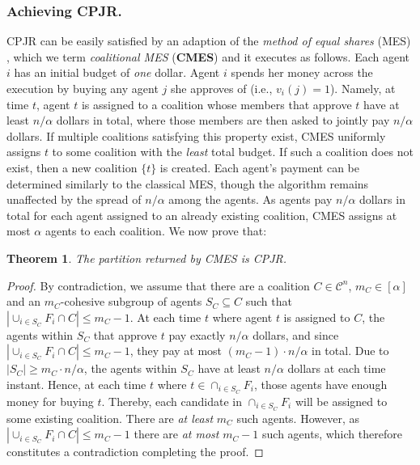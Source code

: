 \documentclass[letterpaper]{article} %
\newtheorem{theorem}{Theorem}
\begin{document}
\subsubsection{Achieving CPJR.}
\label{sec:Proportional Justified Representation (PJR)}
CPJR can be easily satisfied by an adaption of the \textit{method of equal shares} (MES) \cite{peters2021proportional,peters2020proportionality}, which we term \textit{coalitional MES} (\textbf{CMES}) and it executes as follows. Each agent $i$ has an initial budget of \textit{one} dollar. Agent $i$ spends her money across the execution by buying any agent $j$ she approves of (i.e., $v_i(j) = 1$). Namely, at time $t$, agent $t$ is assigned to a coalition whose members that approve $t$ have at least $n/\alpha$ dollars in total, where those members are then asked to jointly pay $n/\alpha$ dollars. If multiple coalitions satisfying this property exist, CMES uniformly assigns $t$ to some coalition with the \textit{least} total budget. If such a coalition does not exist, then a new coalition $\{t\}$ is created. Each agent's payment can be determined similarly to the classical MES, though the algorithm remains unaffected by the spread of $n/\alpha$ among the agents. As agents pay $n/\alpha$ dollars in total for each agent assigned to an already existing coalition, CMES assigns at most $\alpha$ agents to each coalition. We now prove that:
\begin{theorem}
    \label{thm:cmes}
    The partition returned by CMES is CPJR.
\end{theorem}
\begin{proof}
    By contradiction, we assume that there are a coalition $C \in \mathcal{C}^n$, $m_C \in [\alpha]$ and an $m_C$-cohesive subgroup of agents $S_C \subseteq C$ such that $|\cup_{i \in S_C} F_i \cap C| \leq m_C-1$. At each time $t$ where agent $t$ is assigned to $C$, the agents within $S_C$ that approve $t$ pay exactly $n/\alpha$ dollars, and since $|\cup_{i \in S_C} F_i \cap C| \leq m_C-1$, they pay at most $(m_C-1) \cdot n/\alpha$ in total. Due to $|S_C| \geq m_C \cdot n/\alpha$, the agents within $S_C$ have at least $n/\alpha$ dollars at each time instant. Hence, at each time $t$ where $t \in \cap_{i \in S_C} F_i$, those agents have enough money for buying $t$. Thereby, each candidate in $\cap_{i \in S_C} F_i$ will be assigned to some existing coalition. There are \textit{at least} $m_C$ such agents. However, as $|\cup_{i \in S_C} F_i \cap C| \leq m_C-1$ there are \textit{at most} $m_C - 1$ such agents, which therefore constitutes a contradiction completing the proof.
\end{proof}
\end{document}
